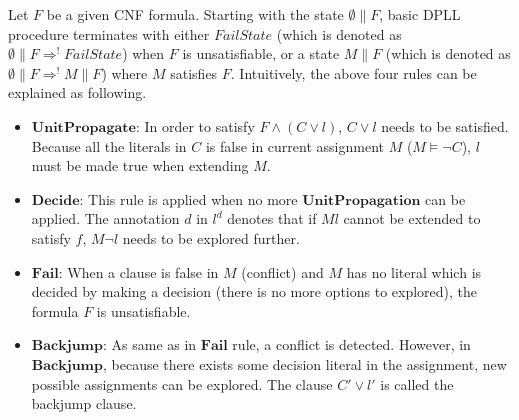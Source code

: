 Let $F$ be a given CNF formula. Starting with the state $\emptyset \parallel F$, basic DPLL procedure terminates with either $FailState$ (which is denoted as $\emptyset \parallel F \Longrightarrow^! FailState$) when $F$ is unsatisfiable, or a state $M \parallel F$ (which is denoted as $\emptyset \parallel F \Longrightarrow^! M \parallel F$) where $M$ satisfies $F$. Intuitively, the above four rules can be explained as following.

\begin{itemize}
\item $\mathbf{UnitPropagate}$: In order to satisfy $F \wedge (C \vee l)$, $C \vee l$ needs to be satisfied. Because all the literals in $C$ is false in current assignment $M$ ($M \models \neg C$), $l$ must be made true when extending $M$.
\item $\mathbf{Decide}$: This rule is applied when no more $\mathbf{UnitPropagation}$ can be applied. The annotation $d$ in $l^d$ denotes that if $Ml$ cannot be extended to satisfy $f$, $M\neg l$ needs to be explored further.
\item $\mathbf{Fail}$: When a clause is false in $M$ (conflict) and $M$ has no literal which is decided by making a decision (there is no more options to explored), the formula $F$ is unsatisfiable.
\item $\mathbf{Backjump}$: As same as in $\mathbf{Fail}$ rule, a conflict is detected. However, in $\mathbf{Backjump}$, because there exists some decision literal in the assignment, new possible assignments can be explored. The clause $C' \vee l'$ is called the backjump clause.
\end{itemize}

